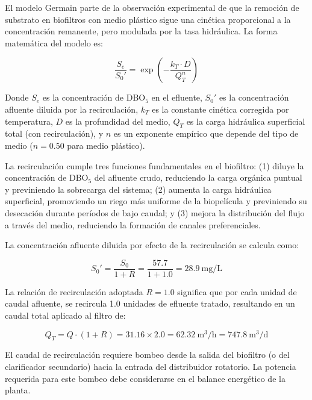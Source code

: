 \documentclass[12pt,a4paper]{article}
\begin{document}
El modelo Germain parte de la observación experimental de que la remoción de substrato en biofiltros con medio plástico sigue una cinética proporcional a la concentración remanente, pero modulada por la tasa hidráulica. La forma matemática del modelo es:

\begin{equation}
\frac{S_e}{S_0'} = \exp\!\left(-\frac{k_T \cdot D}{Q_T^n}\right)
\end{equation}

Donde $S_e$ es la concentración de DBO$_5$ en el efluente, $S_0'$ es la concentración afluente diluida por la recirculación, $k_T$ es la constante cinética corregida por temperatura, $D$ es la profundidad del medio, $Q_T$ es la carga hidráulica superficial total (con recirculación), y $n$ es un exponente empírico que depende del tipo de medio ($n = 0.50$ para medio plástico).

La recirculación cumple tres funciones fundamentales en el biofiltro: (1) diluye la concentración de DBO$_5$ del afluente crudo, reduciendo la carga orgánica puntual y previniendo la sobrecarga del sistema; (2) aumenta la carga hidráulica superficial, promoviendo un riego más uniforme de la biopelícula y previniendo su desecación durante períodos de bajo caudal; y (3) mejora la distribución del flujo a través del medio, reduciendo la formación de canales preferenciales.

La concentración afluente diluida por efecto de la recirculación se calcula como:

\begin{equation}
S_0' = \frac{S_0}{1 + R} = \frac{57.7}{1 + 1.0} = 28.9\ \text{mg/L}
\end{equation}

La relación de recirculación adoptada $R = 1.0$ significa que por cada unidad de caudal afluente, se recircula 1.0 unidades de efluente tratado, resultando en un caudal total aplicado al filtro de:

\begin{equation}
Q_T = Q \cdot (1 + R) = 31.16 \times 2.0 = 62.32\ \text{m}^3\text{/h} = 747.8\ \text{m}^3\text{/d}
\end{equation}

El caudal de recirculación requiere bombeo desde la salida del biofiltro (o del clarificador secundario) hacia la entrada del distribuidor rotatorio. La potencia requerida para este bombeo debe considerarse en el balance energético de la planta.
\end{document}
